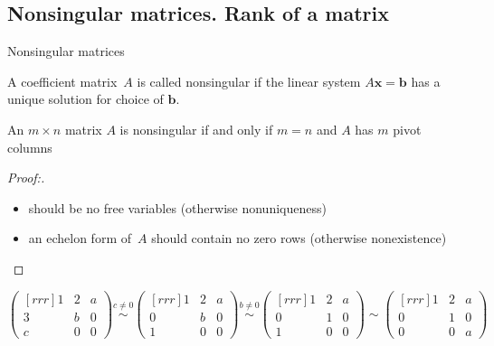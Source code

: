 \documentclass%
[handout]%
{beamer}
\newcommand{\bb}{{\mathbf b}}
\newcommand{\bx}{{\mathbf x}}
\begin{document}
\subsection{Nonsingular matrices. Rank of a matrix}

\begin{frame}[label=singular]{Nonsingular matrices}

 \vspace*{-10pt}

 \begin{definition}
   A coefficient matrix~$A$ is called \alert{nonsingular} if the linear system $A\bx = \bb$ has a unique solution for  choice of $\bb$.
 \end{definition}

 \vspace*{-9pt}

 \begin{theorem}
  An $m\times n$ matrix $A$ is nonsingular if and only if $m=n$ and $A$ has $m$ pivot columns
 \end{theorem}

 \vspace*{-9pt}

 \begin{proof}[Proof:]
  \begin{itemize}
    \item should be no free variables (otherwise nonuniqueness)
    \item an echelon form of~$A$ should contain no zero rows (otherwise nonexistence)
  \end{itemize}
      \vspace*{-20pt}
 \end{proof}

 \vspace*{-9pt}

\begin{example}
 \vspace*{-10pt}
\[
 \begin{pmatrix}[rrr]
    1 &  2 & a \\ 3 & b & 0 \\ c & 0 & 0
 \end{pmatrix}
 \stackrel{c\ne0}{\sim}
 \begin{pmatrix}[rrr]
    1 &  2 & a \\ 0 & b & 0 \\ 1 & 0 & 0
 \end{pmatrix}
 \stackrel{b\ne0}{\sim}
 \begin{pmatrix}[rrr]
    1 &  2 & a \\ 0 & 1 & 0 \\ 1 & 0 & 0
 \end{pmatrix}
 \sim
 \begin{pmatrix}[rrr]
    1 &  2 & a \\ 0 & 1 & 0 \\ 0 & 0 & a
 \end{pmatrix}
 \]


\end{example}
\end{frame}
\end{document}
